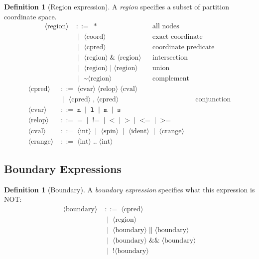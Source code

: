 \documentclass[twocolumn,11pt,a4paper]{article}
\theoremstyle{definition}
\newtheorem{definition}[theorem]{Definition}
\theoremstyle{remark}
\newcommand{\bnfeq}{\;{::=}\;}
\newcommand{\bnfor}{\;\mid\;}
\newcommand{\wild}{{*}}
\begin{document}
\begin{definition}[Region expression]
\label{def:region}
A \emph{region} specifies a subset of partition coordinate space.
\begin{align*}
\langle\text{region}\rangle
  &\bnfeq \wild                         &&\text{all nodes}\\
  &\bnfor \langle\text{coord}\rangle    &&\text{exact coordinate}\\
  &\bnfor \langle\text{cpred}\rangle    &&\text{coordinate predicate}\\
  &\bnfor \langle\text{region}\rangle \;\texttt{\&}\; \langle\text{region}\rangle &&\text{intersection}\\
  &\bnfor \langle\text{region}\rangle \;\texttt{|}\; \langle\text{region}\rangle &&\text{union}\\
  &\bnfor \texttt{\textasciitilde}\langle\text{region}\rangle &&\text{complement}
\end{align*}
\begin{align*}
\langle\text{cpred}\rangle
  &\bnfeq \langle\text{cvar}\rangle \;\langle\text{relop}\rangle\; \langle\text{cval}\rangle\\
  &\bnfor \langle\text{cpred}\rangle \;\texttt{,}\; \langle\text{cpred}\rangle &&\text{conjunction}\\
\langle\text{cvar}\rangle
  &\bnfeq \texttt{n} \bnfor \texttt{l} \bnfor \texttt{m} \bnfor \texttt{s}\\
\langle\text{relop}\rangle
  &\bnfeq \texttt{=} \bnfor \texttt{!=} \bnfor \texttt{<} \bnfor
          \texttt{>} \bnfor \texttt{<=} \bnfor \texttt{>=}\\
\langle\text{cval}\rangle
  &\bnfeq \langle\text{int}\rangle \bnfor \langle\text{spin}\rangle
          \bnfor \langle\text{ident}\rangle \bnfor \langle\text{crange}\rangle\\
\langle\text{crange}\rangle
  &\bnfeq \langle\text{int}\rangle\;\texttt{..}\;\langle\text{int}\rangle
\end{align*}
\end{definition}

\subsection{Boundary Expressions}

\begin{definition}[Boundary]
\label{def:boundary}
A \emph{boundary expression} specifies what this expression is NOT:
\begin{align*}
\langle\text{boundary}\rangle
  &\bnfeq \langle\text{cpred}\rangle\\
  &\bnfor \langle\text{region}\rangle\\
  &\bnfor \langle\text{boundary}\rangle \;\texttt{||}\; \langle\text{boundary}\rangle\\
  &\bnfor \langle\text{boundary}\rangle \;\texttt{\&\&}\; \langle\text{boundary}\rangle\\
  &\bnfor \texttt{!}\langle\text{boundary}\rangle
\end{align*}
\end{definition}
\end{document}
